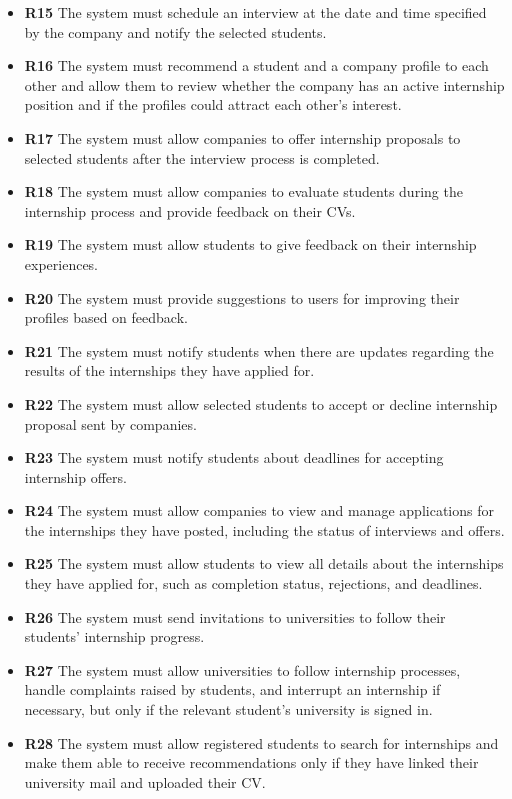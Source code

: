 \documentclass{article}
\begin{document}
\begin{itemize}
        \item \textbf{R15} The system must schedule an interview at the date and time specified by the company and notify the selected students.
        \item \textbf{R16} The system must recommend a student and a company profile to each other and allow them to review whether the company has an active internship position and if the profiles could attract each other's interest.
        \item \textbf{R17} The system must allow companies to offer internship proposals to selected students after the interview process is completed.
        \item \textbf{R18} The system must allow companies to evaluate students during the internship process and provide feedback on their CVs.
        \item \textbf{R19} The system must allow students to give feedback on their internship experiences.
        \item \textbf{R20} The system must provide suggestions to users for improving their profiles based on feedback.
        \item \textbf{R21} The system must notify students when there are updates regarding the results of the internships they have applied for.
        \item \textbf{R22} The system must allow selected students to accept or decline internship proposal sent by companies.    
         \item \textbf{R23} The system must notify students about deadlines for accepting internship offers.
        \item \textbf{R24} The system must allow companies to view and manage applications for the internships they have posted, including the status of interviews and offers.  
        \item \textbf{R25} The system must allow students to view all details about the internships they have applied for, such as completion status, rejections, and deadlines.
        \item \textbf{R26} The system must send invitations to universities to follow their students' internship progress.
        \item \textbf{R27} The system must allow universities to follow internship processes, handle complaints raised by students, and interrupt an internship if necessary, but only if the relevant student's university is signed in.
        \item \textbf{R28} The system must allow registered students to search for internships and make them able to receive recommendations only if they have linked their university mail and uploaded their CV.
        \end{itemize}
\end{document}
